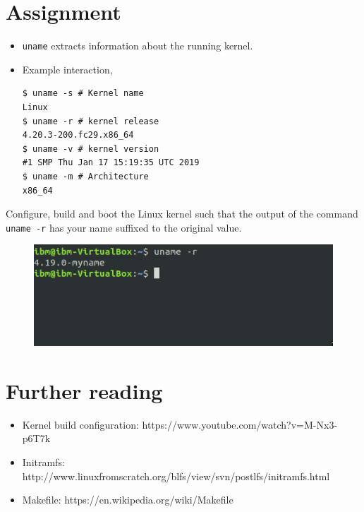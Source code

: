 \documentclass{beamer}
\begin{document}
\section{Assignment}
\begin{frame}[fragile]
  \begin{itemize}
  \item \texttt{uname} extracts information about the running kernel.
  \item Example interaction,
\begin{lstlisting}
$ uname -s # Kernel name
Linux
$ uname -r # kernel release
4.20.3-200.fc29.x86_64
$ uname -v # kernel version
#1 SMP Thu Jan 17 15:19:35 UTC 2019
$ uname -m # Architecture
x86_64
\end{lstlisting}
  \end{itemize}
\end{frame}

\begin{frame}
  Configure, build and boot the Linux kernel such that the output of the
  command \texttt{uname -r} has your name suffixed to the original value. 
    \begin{figure}[h!]
      \centering
      \includegraphics[scale=0.5]{images/assignment.png}
    \end{figure}
\end{frame}

\section{Further reading}

\begin{frame}
  \begin{itemize}
  \item Kernel build configuration:
    { \tiny https://www.youtube.com/watch?v=M-Nx3-p6T7k }
  \item Initramfs: {\tiny  http://www.linuxfromscratch.org/blfs/view/svn/postlfs/initramfs.html}
  \item Makefile: { \tiny https://en.wikipedia.org/wiki/Makefile }
  \end{itemize}
  
\end{frame}
\end{document}
